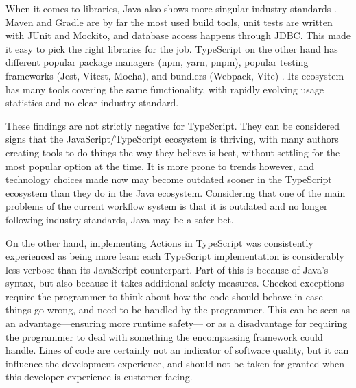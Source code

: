 When it comes to libraries, Java also shows more singular industry standards \autocite{JetBrains2023}. Maven and Gradle are by far the most used build tools, unit tests are written with JUnit and Mockito, and database access happens through JDBC.  This made it easy to pick the right libraries for the job. TypeScript on the other hand has different popular package managers (npm, yarn, pnpm), popular testing frameworks (Jest, Vitest, Mocha), and bundlers (Webpack, Vite) \autocite{Greif2024}. Its ecosystem has many tools covering the same functionality, with rapidly evolving usage statistics and no clear industry standard.

These findings are not strictly negative for TypeScript. They can be considered signs that the JavaScript/TypeScript ecosystem is thriving, with many authors creating tools to do things the way they believe is best, without settling for the most popular option at the time. It is more prone to trends however, and technology choices made now may become outdated sooner in the TypeScript ecosystem than they do in the Java ecosystem. Considering that one of the main problems of the current workflow system is that it is outdated and no longer following industry standards, Java may be a safer bet. 

On the other hand, implementing Actions in TypeScript was consistently experienced as being more lean: each TypeScript implementation is considerably less verbose than its JavaScript counterpart. Part of this is because of Java's syntax, but also because it takes additional safety measures. Checked exceptions require the programmer to think about how the code should behave in case things go wrong, and need to be handled by the programmer. This can be seen as an advantage—ensuring more runtime safety— or as a disadvantage for requiring the programmer to deal with something the encompassing framework could handle. Lines of code are certainly not an indicator of software quality, but it can influence the development experience, and should not be taken for granted when this developer experience is customer-facing.
